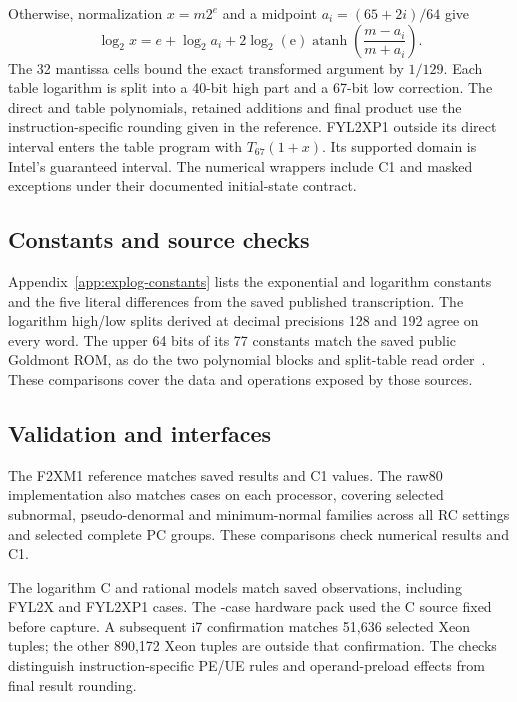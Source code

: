\documentclass[11pt]{article}
\begin{document}
Otherwise, normalization $x=m2^e$ and a midpoint $a_i=(65+2i)/64$ give
\begin{equation}
 \log_2x=e+\log_2a_i+
 2\log_2(\mathrm e)\operatorname{atanh}\!\left(\frac{m-a_i}{m+a_i}\right).
\end{equation}
The 32 mantissa cells bound the exact transformed argument by $1/129$.
Each table logarithm is split into a 40-bit high part and a 67-bit low
correction. The direct and table polynomials, retained additions and final
product use the instruction-specific rounding given in the reference.
FYL2XP1 outside its direct interval enters the table program with $T_{67}(1+x)$.
Its supported domain is Intel's guaranteed interval. The numerical wrappers
include C1 and masked exceptions under their documented initial-state contract.

\subsection{Constants and source checks}
\label{sec:explog-constants}

Appendix~\ref{app:explog-constants} lists the exponential and logarithm
constants and the five literal differences from the saved published
transcription. The logarithm high/low splits derived at decimal precisions
128 and 192 agree on every word. The upper 64 bits of its 77 constants
match the saved public Goldmont ROM, as do the two polynomial blocks and
split-table read order~\cite{ucodeDisasm,customProcessingUnit}. These
comparisons cover the data and operations exposed by those sources.

\subsection{Validation and interfaces}
\label{sec:explog-validation}



The F2XM1 reference matches \FtwoRows{} saved results and C1 values.
The raw80 implementation also matches \FtwoRawRows{} cases on each
processor, covering selected subnormal, pseudo-denormal and minimum-normal
families across all RC settings and selected complete PC groups. These
comparisons check numerical results and C1.

The logarithm C and rational models match \LogRows{} saved observations,
including \LogXRows{} FYL2X and \LogPoneRows{} FYL2XP1 cases. The
\LogFreshRows{}-case hardware pack used the C source fixed before capture.
A subsequent i7 confirmation matches 51,636 selected Xeon tuples; the other
890,172 Xeon tuples are outside that confirmation. The checks distinguish
instruction-specific PE/UE rules and operand-preload effects from final
result rounding.
\end{document}
